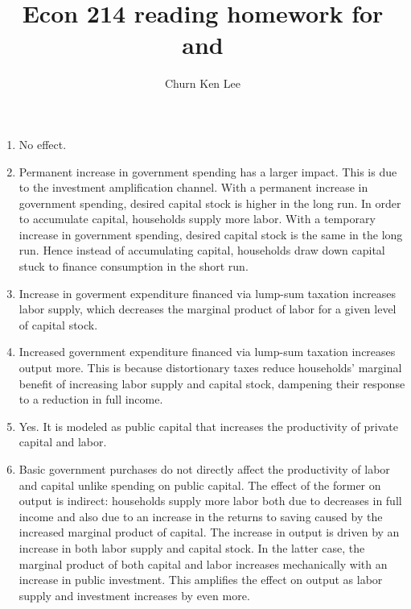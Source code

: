 \documentclass[12pt]{article}
\title{Econ 214 reading homework for \textcite{baxter_king_1993} and \textcite{woodford_2011}}
\author{Churn Ken Lee}
\date{}
\begin{document}
\maketitle

\section{\cite{baxter_king_1993}}
\begin{enumerate}
    \item No effect.
    \item Permanent increase in government spending has a larger impact. 
    This is due to the investment amplification channel. 
    With a permanent increase in government spending, desired capital stock is higher in the long run.
    In order to accumulate capital, households supply more labor.
    With a temporary increase in government spending, desired capital stock is the same in the long run.
    Hence instead of accumulating capital, households draw down capital stuck to finance consumption in the short run.
    \item Increase in goverment expenditure financed via lump-sum taxation increases labor supply, which decreases the marginal product of labor for a given level of capital stock.
    \item Increased government expenditure financed via lump-sum taxation increases output more. This is because distortionary taxes reduce households' marginal benefit of increasing labor supply and capital stock, dampening their response to a reduction in full income.
    \item Yes.
    It is modeled as public capital that increases the productivity of private capital and labor.
    \item Basic government purchases do not directly affect the productivity of labor and capital unlike spending on public capital.
    The effect of the former on output is indirect: households supply more labor both due to decreases in full income and also due to an increase in the returns to saving caused by the increased marginal product of capital.
    The increase in output is driven by an increase in both labor supply and capital stock.
    In the latter case, the marginal product of both capital and labor increases mechanically with an increase in public investment.
    This amplifies the effect on output as labor supply and investment increases by even more.
\end{enumerate}

\section{\cite{woodford_2011}}

\printbibliography
\end{document}
